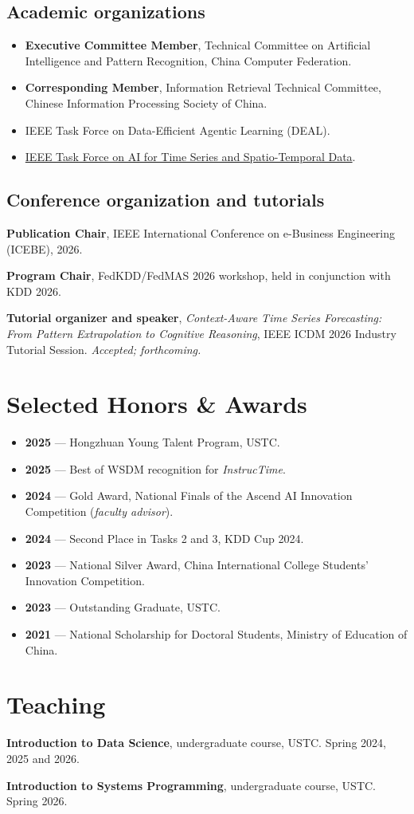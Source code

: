 \documentclass[UTF8,fontset=fandol,scheme=plain,11pt,a4paper]{ctexart}
\begin{document}
\subsection{Academic organizations}
\begin{itemize}[itemsep=3pt]
\item \textbf{Executive Committee Member}, Technical Committee on Artificial Intelligence and Pattern Recognition, China Computer Federation.
\item \textbf{Corresponding Member}, Information Retrieval Technical Committee, Chinese Information Processing Society of China.
\item IEEE Task Force on Data-Efficient Agentic Learning (DEAL).
\item \href{https://cis.taskforce.ieee.org/ai4tst/}{IEEE Task Force on AI for Time Series and Spatio-Temporal Data}.
\end{itemize}
\subsection{Conference organization and tutorials}
\textbf{Publication Chair}, IEEE International Conference on e-Business Engineering (ICEBE), 2026.

\textbf{Program Chair}, FedKDD/FedMAS 2026 workshop, held in conjunction with KDD 2026.

\textbf{Tutorial organizer and speaker}, \emph{Context-Aware Time Series Forecasting: From Pattern Extrapolation to Cognitive Reasoning}, IEEE ICDM 2026 Industry Tutorial Session. \textit{Accepted; forthcoming.}
\section{Selected Honors \& Awards}
\begin{itemize}[itemsep=3pt]
\item \textbf{2025} --- Hongzhuan Young Talent Program, USTC.
\item \textbf{2025} --- Best of WSDM recognition for \textit{InstrucTime}.
\item \textbf{2024} --- Gold Award, National Finals of the Ascend AI Innovation Competition (\textit{faculty advisor}).
\item \textbf{2024} --- Second Place in Tasks 2 and 3, KDD Cup 2024.
\item \textbf{2023} --- National Silver Award, China International College Students' Innovation Competition.
\item \textbf{2023} --- Outstanding Graduate, USTC.
\item \textbf{2021} --- National Scholarship for Doctoral Students, Ministry of Education of China.
\end{itemize}
\section{Teaching}
\textbf{Introduction to Data Science}, undergraduate course, USTC. Spring 2024, 2025 and 2026.

\textbf{Introduction to Systems Programming}, undergraduate course, USTC. Spring 2026.
\end{document}
